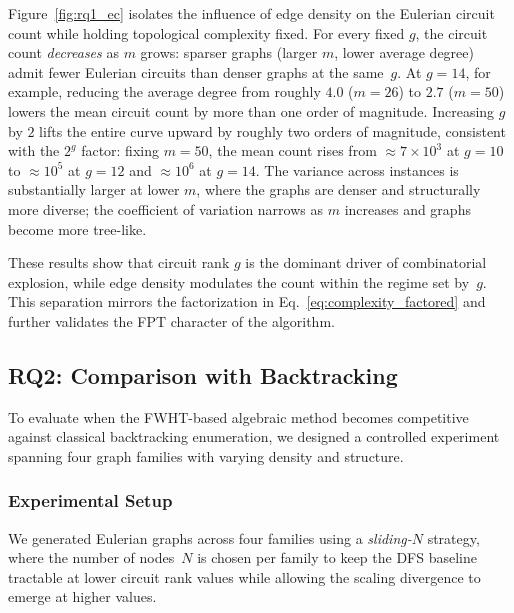 \documentclass[acmsmall,review]{acmart}
\begin{document}
	Figure~\ref{fig:rq1_ec} isolates the influence of edge density on the Eulerian circuit count while holding topological complexity fixed. For every fixed $g$, the circuit count \emph{decreases} as $m$ grows: sparser graphs (larger $m$, lower average degree) admit fewer Eulerian circuits than denser graphs at the same~$g$. At $g=14$, for example, reducing the average degree from roughly $4.0$ ($m=26$) to $2.7$ ($m=50$) lowers the mean circuit count by more than one order of magnitude. Increasing $g$ by $2$ lifts the entire curve upward by roughly two orders of magnitude, consistent with the $2^g$ factor: fixing $m=50$, the mean count rises from $\approx 7\times10^{3}$ at $g=10$ to $\approx 10^{5}$ at $g=12$ and $\approx 10^{6}$ at $g=14$. The variance across instances is substantially larger at lower $m$, where the graphs are denser and structurally more diverse; the coefficient of variation narrows as $m$ increases and graphs become more tree-like.
	
	These results show that circuit rank $g$ is the dominant driver of combinatorial explosion, while edge density modulates the count within the regime set by~$g$. This separation mirrors the factorization in Eq.~\eqref{eq:complexity_factored} and further validates the FPT character of the algorithm.
	
	\subsection{RQ2: Comparison with Backtracking}
	\label{subsec:crossover}
	
	To evaluate when the FWHT-based algebraic method becomes competitive against classical backtracking enumeration, we designed a controlled experiment spanning four graph families with varying density and structure.
	
	\subsubsection{Experimental Setup}
	
	We generated Eulerian graphs across four families using a \emph{sliding-$N$} strategy, where the number of nodes~$N$ is chosen per family to keep the DFS baseline tractable at lower circuit rank values while allowing the scaling divergence to emerge at higher values.
	
\end{document}
